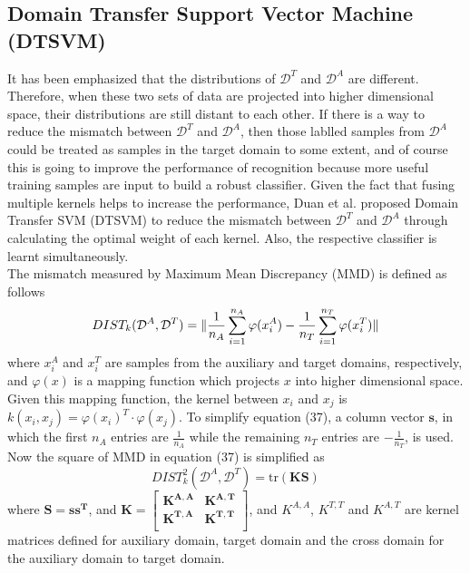 \subsection{Domain Transfer Support Vector Machine (DTSVM)}
It has been emphasized that the distributions of $\mathcal{D}^T$ and $\mathcal{D}^A$ are different. Therefore, when these two sets of data are projected into higher dimensional space, their distributions are still distant to each other. If there is a way to reduce the mismatch between $\mathcal{D}^T$ and $\mathcal{D}^A$, then those lablled samples from $\mathcal{D}^A$ could be treated as samples in the target domain to some extent, and of course this is going to improve the performance of recognition because more useful training samples are input to build a robust classifier. Given the fact that fusing multiple kernels helps to increase the performance, Duan et al. \cite{duan2009domain} proposed Domain Transfer SVM (DTSVM) to reduce the mismatch between $\mathcal{D}^T$ and $\mathcal{D}^A$ through calculating the optimal weight of each kernel. Also, the respective classifier is learnt simultaneously. \\

\noindent The mismatch measured by Maximum Mean Discrepancy (MMD) \cite{borgwardt2006integrating} is defined as follows
\begin{equation}
DIST_k(\mathcal{D}^A, \mathcal{D}^T) = \lVert \frac{1}{n_A} \sum_{i=1}^{n_A} \varphi(x_i^A) - \frac{1}{n_T} \sum_{i=1}^{n_T} \varphi (x_i^T) \rVert
\end{equation}
where $x_i^A$ and $x_i^T$ are samples from the auxiliary and target domains, respectively, and $\varphi(x)$ is a mapping function which projects $x$ into higher dimensional space. Given this mapping function, the kernel between $x_i$
 and $x_j$ is $k(x_i, x_j) = \varphi (x_i)^T \cdot \varphi (x_j)$. To simplify equation (37), a column vector $\mathbf{s}$, in which the first $n_A$ entries are $\frac{1}{n_A}$ while the remaining $n_T$ entries are $-\frac{1}{n_T}$, is used. Now the square of MMD in equation (37) is simplified as 
\begin{equation}
DIST_k^2(\mathcal{D}^A, \mathcal{D}^T) = \text{tr}(\mathbf{KS})
\end{equation}
where $\mathbf{S = s s^T }$, and $\mathbf{K = \begin{bmatrix} K^{A,A} & K^{A,T} \\ K^{T, A} & K^{T,T}\\  \end{bmatrix}}$, and $K^{A,A}$, $K^{T,T}$ and $K^{A, T}$ are kernel matrices defined for auxiliary domain, target domain and the cross domain for the auxiliary domain to target domain.\\ 

